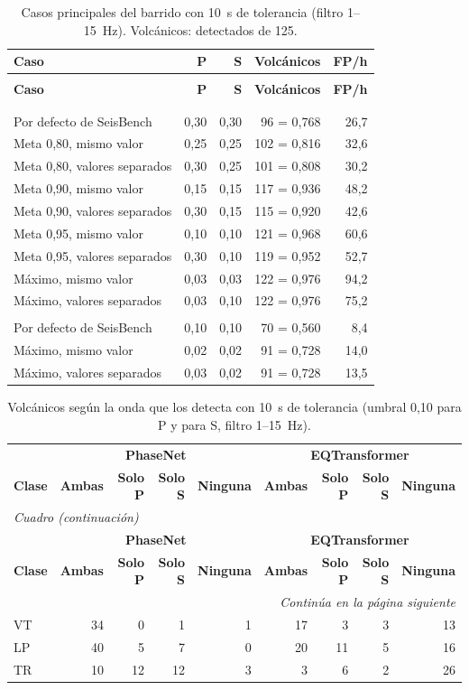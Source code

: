\documentclass[11pt,a4paper,oneside,spanish,oldfontcommands]{memoir}
\newcommand{\cabecera}[2]{%
  \toprule #1 \\ \midrule \endfirsthead
  \multicolumn{#2}{l}{\itshape Cuadro \thetable{} (continuación)}\\
  \toprule #1 \\ \midrule \endhead
  \midrule \multicolumn{#2}{r}{\itshape Continúa en la página siguiente}\\ \endfoot
  \bottomrule \endlastfoot}
\begin{document}
{\small
\setlength{\tabcolsep}{5pt}
\begin{longtable}{>{\raggedright\arraybackslash}p{6.2cm}rrrr}
\caption{Casos principales del barrido con 10~s de tolerancia (filtro 1--15~Hz). Volcánicos: detectados de 125.}\label{tab:ps-casos-10}\\
\cabecera{\textbf{Caso} & \textbf{P} & \textbf{S} & \textbf{Volcánicos} & \textbf{FP/h}}{5}
\multicolumn{5}{l}{\textit{PhaseNet}}\\
\addlinespace
Por defecto de SeisBench & 0,30 & 0,30 & 96 = 0,768 & 26,7 \\
Meta 0,80, mismo valor & 0,25 & 0,25 & 102 = 0,816 & 32,6 \\
Meta 0,80, valores separados & 0,30 & 0,25 & 101 = 0,808 & 30,2 \\
Meta 0,90, mismo valor & 0,15 & 0,15 & 117 = 0,936 & 48,2 \\
Meta 0,90, valores separados & 0,30 & 0,15 & 115 = 0,920 & 42,6 \\
Meta 0,95, mismo valor & 0,10 & 0,10 & 121 = 0,968 & 60,6 \\
Meta 0,95, valores separados & 0,30 & 0,10 & 119 = 0,952 & 52,7 \\
Máximo, mismo valor & 0,03 & 0,03 & 122 = 0,976 & 94,2 \\
Máximo, valores separados & 0,03 & 0,10 & 122 = 0,976 & 75,2 \\
\midrule
\multicolumn{5}{l}{\textit{EQTransformer}}\\
\addlinespace
Por defecto de SeisBench & 0,10 & 0,10 & 70 = 0,560 & 8,4 \\
Máximo, mismo valor & 0,02 & 0,02 & 91 = 0,728 & 14,0 \\
Máximo, valores separados & 0,03 & 0,02 & 91 = 0,728 & 13,5 \\
\end{longtable}
}

{\small
\setlength{\tabcolsep}{5pt}
\begin{longtable}{lrrrrrrrr}
\caption{Volcánicos según la onda que los detecta con 10~s de tolerancia (umbral 0,10 para P y para S, filtro 1--15~Hz).}\label{tab:solo-ps-10}\\
\cabecera{ & \multicolumn{4}{c}{\textbf{PhaseNet}} & \multicolumn{4}{c}{\textbf{EQTransformer}} \\ \textbf{Clase} & \textbf{Ambas} & \textbf{Solo P} & \textbf{Solo S} & \textbf{Ninguna} & \textbf{Ambas} & \textbf{Solo P} & \textbf{Solo S} & \textbf{Ninguna}}{9}
VT & 34 & 0 & 1 & 1 & 17 & 3 & 3 & 13 \\
LP & 40 & 5 & 7 & 0 & 20 & 11 & 5 & 16 \\
TR & 10 & 12 & 12 & 3 & 3 & 6 & 2 & 26 \\
\end{longtable}
}
\end{document}
